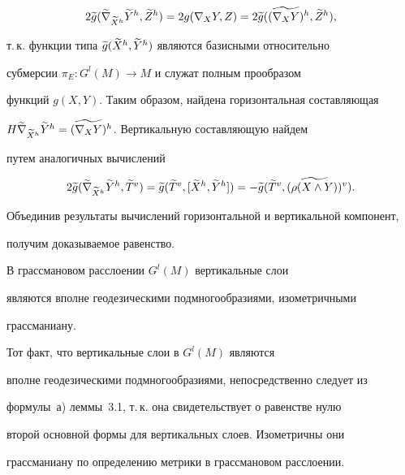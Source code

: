 \begin{pf}
$$


2\g{g}(\grn{\thX}{\grh{Y}},\grh{Z})=2g(\n{X}{Y},Z)=


2\g{g}(\grh{(\n{X}{Y})},\grh{Z}),


$$


т.\,к. функции типа $\widetilde {g}(\widetilde {X}{}^h,\widetilde {Y}{}^h)$ являются базисными относительно


субмерсии $\pi_E:G^l(M)\longrightarrow M$ и служат полным прообразом


функций $g(X,Y)$. Таким образом, найдена горизонтальная составляющая


$H\widetilde\nabla_{\widetilde X{}^h}{\widetilde {Y}{}^h}=\widetilde {(\nabla_{X}{Y})}{}^h$. Вертикальную составляющую найдем


путем аналогичных вычислений


$$


2\g{g}(\grn{\thX}{\grh{Y}},\grv{T})=\g{g}(\grv{T},[\grh{X},\grh{Y}])=


-\g{g}(\grv{T},\grv{(\rho(X\land Y))}).


$$


Объединив результаты вычислений горизонтальной и вертикальной компонент,


получим доказываемое равенство.


\end{pf}





\begin{cors} В грассмановом расслоении $G^l(M)$ вертикальные слои


являются вполне геодезическими подмногообразиями, изометричными


грассманиану.


\end{cors}





\begin{pf} Тот факт, что вертикальные слои в $G^l(M)$ являются


вполне геодезическими подмногообразиями, непосредственно следует из


формулы~а) леммы~3.1, т.\,к. она свидетельствует о равенстве нулю


второй основной формы для вертикальных слоев. Изометричны они


грассманиану по определению метрики в грассмановом расслоении.


\end{pf}





